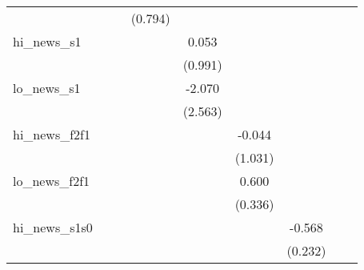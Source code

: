 {\begin{tabular}{l*{8}{c}}
            &                     &                     &     (0.794)         &                     &                     &                     &                     &                     \\
\addlinespace
hi\_news\_s1  &                     &                     &                     &       0.053         &                     &                     &                     &                     \\
            &                     &                     &                     &     (0.991)         &                     &                     &                     &                     \\
\addlinespace
lo\_news\_s1  &                     &                     &                     &      -2.070         &                     &                     &                     &                     \\
            &                     &                     &                     &     (2.563)         &                     &                     &                     &                     \\
\addlinespace
hi\_news\_f2f1&                     &                     &                     &                     &      -0.044         &                     &                     &                     \\
            &                     &                     &                     &                     &     (1.031)         &                     &                     &                     \\
\addlinespace
lo\_news\_f2f1&                     &                     &                     &                     &       0.600\sym{*}  &                     &                     &                     \\
            &                     &                     &                     &                     &     (0.336)         &                     &                     &                     \\
\addlinespace
hi\_news\_s1s0&                     &                     &                     &                     &                     &      -0.568\sym{**} &                     &                     \\
            &                     &                     &                     &                     &                     &     (0.232)         &                     &                     \\

\end{tabular}}
